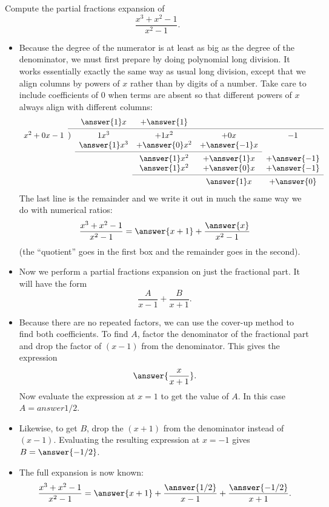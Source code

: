 \documentclass{ximera}
\begin{document}
\begin{example}
Compute the partial fractions expansion of
\[ \frac{x^3 + x^2 -1}{x^2-1}. \]
\begin{itemize}
\item Because the degree of the numerator is at least as big as the degree of the denominator, we must first prepare by doing polynomial long division. It works essentially exactly the same way as usual long division, except that we align columns by powers of $x$ rather than by digits of a number. Take care to include coefficients of $0$ when terms are absent so that different powers of $x$ always align with different columns:
\[ 
\begin{array}{r@{\hskip\arraycolsep}lcccc}
 && \answer{1}x & + \answer{1} & & \\
 \cmidrule{2-6}
x^2 + 0 x - 1 &)& 1 x^3 & + 1 x^2 & + 0 x & -1 \\
 && \answer{1} x^3 & + \answer{0} x^2 & + \answer{-1} x &  \\
\cmidrule{3-5} 
  && & \answer{1} x^2 & + \answer{1} x & + \answer{-1} \\
  && & \answer{1} x^2 & + \answer{0} x & + \answer{-1} \\
\cmidrule{4-6}
  && &  & \answer{1} x & + \answer{0}
\end{array}
\]
The last line is the remainder and we write it out in much the same way we do with numerical ratios:
\[ \frac{x^3 + x^2 - 1}{x^2 - 1} = \answer{ x + 1} + \frac{\answer{x}}{x^2-1} \]
(the ``quotient'' goes in the first box and the remainder goes in the second).
\item Now we perform a partial fractions expansion on just the fractional part.  It will have the form
\[ \frac{A}{x-1} + \frac{B}{x+1}. \]
\item Because there are no repeated factors, we can use the cover-up method to find both coefficients.  To find $A$, factor the denominator of the fractional part and drop the factor of $(x-1)$ from the denominator. This gives the expression
\[ \answer{\frac{x}{x+1}}. \]
Now evaluate the expression at $x = 1$ to get the value of $A$. In this case $A = answer{1/2}$.
\item Likewise, to get $B$, drop the $(x+1)$ from the denominator instead of $(x-1)$. Evaluating the resulting expression at $x = -1$ gives $B = \answer{-1/2}$.  
\item The full expansion is now known:
\[ \frac{x^3+x^2-1}{x^2-1} = \answer{x+1} + \frac{\answer{1/2}}{x-1} + \frac{\answer{-1/2}}{x+1}. \]
\end{itemize}
\end{example}
\end{document}
